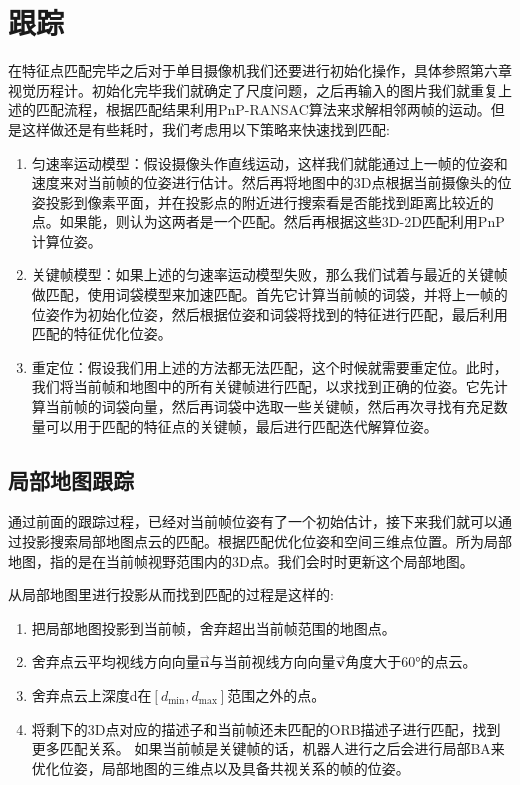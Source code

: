 \section{跟踪}
在特征点匹配完毕之后对于单目摄像机我们还要进行初始化操作，具体参照第六章视觉历程计。初始化完毕我们就确定了尺度问题，之后再输入的图片我们就重复上述的匹配流程，根据匹配结果利用PnP-RANSAC算法来求解相邻两帧的运动。但是这样做还是有些耗时，我们考虑用以下策略来快速找到匹配:
\begin{enumerate}
	\item 匀速率运动模型：假设摄像头作直线运动，这样我们就能通过上一帧的位姿和速度来对当前帧的位姿进行估计。然后再将地图中的3D点根据当前摄像头的位姿投影到像素平面，并在投影点的附近进行搜索看是否能找到距离比较近的点。如果能，则认为这两者是一个匹配。然后再根据这些3D-2D匹配利用PnP计算位姿。
	\item 关键帧模型：如果上述的匀速率运动模型失败，那么我们试着与最近的关键帧做匹配，使用词袋模型来加速匹配。首先它计算当前帧的词袋，并将上一帧的位姿作为初始化位姿，然后根据位姿和词袋将找到的特征进行匹配，最后利用匹配的特征优化位姿。
	\item 重定位：假设我们用上述的方法都无法匹配，这个时候就需要重定位。此时，我们将当前帧和地图中的所有关键帧进行匹配，以求找到正确的位姿。它先计算当前帧的词袋向量，然后再词袋中选取一些关键帧，然后再次寻找有充足数量可以用于匹配的特征点的关键帧，最后进行匹配迭代解算位姿。  
\end{enumerate}
\subsection{局部地图跟踪}
通过前面的跟踪过程，已经对当前帧位姿有了一个初始估计，接下来我们就可以通过投影搜索局部地图点云的匹配。根据匹配优化位姿和空间三维点位置。所为局部地图，指的是在当前帧视野范围内的3D点。我们会时时更新这个局部地图。\par
从局部地图里进行投影从而找到匹配的过程是这样的:
\begin{enumerate}
\item 把局部地图投影到当前帧，舍弃超出当前帧范围的地图点。
\item 舍弃点云平均视线方向向量$\overrightarrow{\mathbf{n}}$与当前视线方向向量$\overrightarrow{\mathbf{v}}$角度大于60°的点云。
\item 舍弃点云上深度d在$\left[d_{\min }, d_{\max }\right]$范围之外的点。
\item 将剩下的3D点对应的描述子和当前帧还未匹配的ORB描述子进行匹配，找到更多匹配关系。
如果当前帧是关键帧的话，机器人进行之后会进行局部BA来优化位姿，局部地图的三维点以及具备共视关系的帧的位姿。
\end{enumerate}
